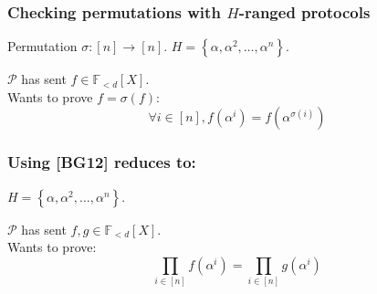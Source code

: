 \documentclass[shadesubsections,trans,14pt,mathserif]{beamer}
\newcommand{\F}{\ensuremath{\mathbb F}}
\newcommand{\set}[1]{\ensuremath{\left\{#1\right\}}}
\newcommand{\ver}{\ensuremath{\mathcal{V}}}
\newcommand{\prv}{\ensuremath{\mathcal{P}}}
\newcommand{\polysofdeg}[1]{\F_{< #1}[X]}
\newcommand{\gen}{\alpha}
\begin{document}
%  
%  
% 
% 



\begin{frame}
\frametitle{Checking permutations with $H$-ranged protocols}   %
 Permutation $\sigma: [n]\to [n]$.
 $H=\set{\gen,\gen^2,\ldots,\gen^n}$.\\
 \vspace{0.2in}
 
 $\prv$ has sent $f\in \polysofdeg{d}$.\\
 \vspace{0.2in}
 Wants to prove $f=\sigma(f)$:
 \[\forall i\in [n], f(\gen^i) = f(\gen^{\sigma(i)})\]

 

\end{frame}
\begin{frame}
\frametitle{Using [BG12] reduces to:}   %
 $H=\set{\gen,\gen^2,\ldots,\gen^n}$.\\
 \vspace{0.2in}
 
 $\prv$ has sent $f,g\in \polysofdeg{d}$.\\
 \vspace{0.2in}
 Wants to prove:
 \[\prod_{i\in [n]}  f(\gen^i) = \prod_{i\in [n]} g(\gen^i)\]

 

\end{frame}
\end{document}
